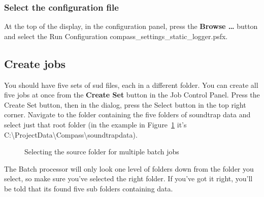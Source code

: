 \documentclass[
]{article}
\begin{document}
\subsubsection{Select the configuration
file}\label{select-the-configuration-file}

At the top of the display, in the configuration panel, press the
\textbf{Browse \ldots{}} button and select the Run Configuration
compass\_settings\_static\_logger.psfx.

\subsection{Create jobs}\label{create-jobs}

You should have five sets of sud files, each in a different folder. You
can create all five jobs at once from the \textbf{Create Set} button in
the Job Control Panel. Press the Create Set button, then in the dialog,
press the Select button in the top right corner. Navigate to the folder
containing the five folders of soundtrap data and select just that root
folder (in the example in Figure~\ref{fig-createset} it's
C:\textbackslash ProjectData\textbackslash Compass\textbackslash soundtrapdata).

\begin{figure}


\caption{\label{fig-createset}Selecting the source folder for multiple
batch jobs}

\end{figure}%

The Batch processor will only look one level of folders down from the
folder you select, so make sure you've selected the right folder. If
you've got it right, you'll be told that its found five sub folders
containing data.
\end{document}
